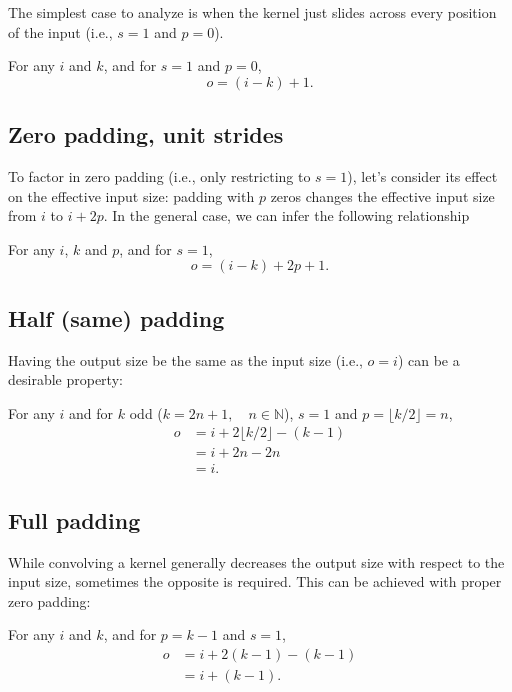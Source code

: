 \documentclass[%
oneside,                 %
final,                   %
10pt]{article}
\begin{document}
The simplest case to analyze is when the kernel just slides across every
position of the input (i.e., $s = 1$ and $p = 0$).

For any $i$ and $k$, and for $s = 1$ and $p = 0$,
\begin{equation*}
    o = (i - k) + 1.
\end{equation*}

\subsection{Zero padding, unit strides}

To factor in zero padding (i.e., only restricting to $s = 1$), let's consider
its effect on the effective input size: padding with $p$ zeros changes the
effective input size from $i$ to $i + 2p$. In the general case, we can infer the following
relationship

For any $i$, $k$ and $p$, and for $s = 1$,
\begin{equation*}
    o = (i - k) + 2p + 1.
\end{equation*}

\subsection{Half (same) padding}

Having the output size be the same as the input size (i.e., $o = i$) can be a
desirable property:

For any $i$ and for $k$ odd ($k = 2n + 1, \quad n \in \mathbb{N}$), $s = 1$ and
$p = \lfloor k / 2 \rfloor = n$,
\begin{equation*}
\begin{split}
    o &= i + 2 \lfloor k / 2 \rfloor - (k - 1) \\
      &= i + 2n - 2n \\
      &= i.
\end{split}
\end{equation*}

\subsection{Full padding}

While convolving a kernel generally decreases the output size with
respect to the input size, sometimes the opposite is required. This can be
achieved with proper zero padding:

For any $i$ and $k$, and for $p = k - 1$ and $s = 1$,
\begin{equation*}
\begin{split}
    o &= i + 2(k - 1) - (k - 1) \\
      &= i + (k - 1).
\end{split}
\end{equation*}
\end{document}
